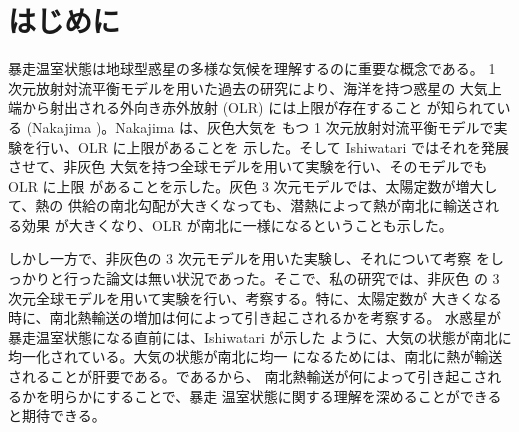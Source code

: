 \documentclass[body]{subfiles}
\begin{document}
\chapter{はじめに}
暴走温室状態は地球型惑星の多様な気候を理解するのに重要な概念である。
1 次元放射対流平衡モデルを用いた過去の研究により、海洋を持つ惑星の
大気上端から射出される外向き赤外放射 (OLR) には上限が存在すること
が知られている (Nakajima )。Nakajima \etal は、灰色大気を
もつ 1 次元放射対流平衡モデルで実験を行い、OLR に上限があることを
示した。そして Ishiwatari  ではそれを発展させて、非灰色
大気を持つ全球モデルを用いて実験を行い、そのモデルでも OLR に上限
があることを示した。灰色 3 次元モデルでは、太陽定数が増大して、熱の
供給の南北勾配が大きくなっても、潜熱によって熱が南北に輸送される効果
が大きくなり、OLR が南北に一様になるということも示した。

しかし一方で、非灰色の 3 次元モデルを用いた実験し、それについて考察
をしっかりと行った論文は無い状況であった。そこで、私の研究では、非灰色
の 3 次元全球モデルを用いて実験を行い、考察する。特に、太陽定数が
大きくなる時に、南北熱輸送の増加は何によって引き起こされるかを考察する。
水惑星が暴走温室状態になる直前には、Ishiwatari  が示した
ように、大気の状態が南北に均一化されている。大気の状態が南北に均一
になるためには、南北に熱が輸送されることが肝要である。であるから、
南北熱輸送が何によって引き起こされるかを明らかにすることで、暴走
温室状態に関する理解を深めることができると期待できる。
\end{document}
